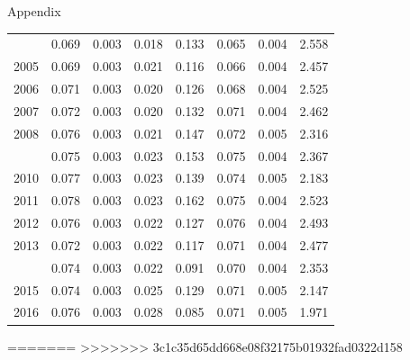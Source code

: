 \documentclass[10pt,ignorenonframetext,]{beamer}
\begin{document}
\begin{frame}[allowframebreaks]{Appendix}
\begin{longtable}[t]{rrrrrrrl}
\addlinespace
2004 & 0.069 & 0.003 & 0.018 & 0.133 & 0.065 & 0.004 & 2.558\\
2005 & 0.069 & 0.003 & 0.021 & 0.116 & 0.066 & 0.004 & 2.457\\
2006 & 0.071 & 0.003 & 0.020 & 0.126 & 0.068 & 0.004 & 2.525\\
2007 & 0.072 & 0.003 & 0.020 & 0.132 & 0.071 & 0.004 & 2.462\\
2008 & 0.076 & 0.003 & 0.021 & 0.147 & 0.072 & 0.005 & 2.316\\
\addlinespace
2009 & 0.075 & 0.003 & 0.023 & 0.153 & 0.075 & 0.004 & 2.367\\
2010 & 0.077 & 0.003 & 0.023 & 0.139 & 0.074 & 0.005 & 2.183\\
2011 & 0.078 & 0.003 & 0.023 & 0.162 & 0.075 & 0.004 & 2.523\\
2012 & 0.076 & 0.003 & 0.022 & 0.127 & 0.076 & 0.004 & 2.493\\
2013 & 0.072 & 0.003 & 0.022 & 0.117 & 0.071 & 0.004 & 2.477\\
\addlinespace
2014 & 0.074 & 0.003 & 0.022 & 0.091 & 0.070 & 0.004 & 2.353\\
2015 & 0.074 & 0.003 & 0.025 & 0.129 & 0.071 & 0.005 & 2.147\\
2016 & 0.076 & 0.003 & 0.028 & 0.085 & 0.071 & 0.005 & 1.971\\*
\end{longtable}\endgroup{}

=======
\textgreater{}\textgreater{}\textgreater{}\textgreater{}\textgreater{}\textgreater{}\textgreater{}
3c1c35d65dd668e08f32175b01932fad0322d158

\end{frame}
\end{document}
